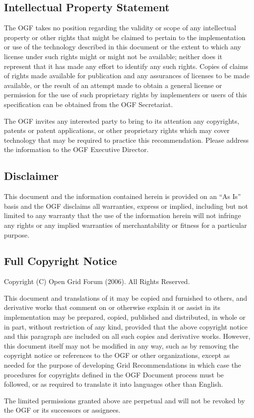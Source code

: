  
 
 
 \subsection{Intellectual Property Statement}
 
  The OGF takes no position regarding the validity or scope of any
  intellectual property or other rights that might be claimed to
  pertain to the implementation or use of the technology described in
  this document or the extent to which any license under such rights
  might or might not be available; neither does it represent that it
  has made any effort to identify any such rights. Copies of claims of
  rights made available for publication and any assurances of licenses
  to be made available, or the result of an attempt made to obtain a
  general license or permission for the use of such proprietary rights
  by implementers or users of this specification can be obtained from
  the OGF Secretariat. 

  The OGF invites any interested party to bring to its attention any
  copyrights, patents or patent applications, or other proprietary
  rights which may cover technology that may be required to practice
  this recommendation. Please address the information to the OGF
  Executive Director.
 
 
 \subsection{Disclaimer}
 
  This document and the information contained herein is provided on an
  ``As Is'' basis and the OGF disclaims all warranties, express or
  implied, including but not limited to any warranty that the use of
  the information herein will not infringe any rights or any implied
  warranties of merchantability or fitness for a particular purpose. 
  
 
 \subsection{Full Copyright Notice}
 
  Copyright (C) Open Grid Forum (2006). All Rights Reserved. 
 
  This document and translations of it may be copied and furnished to
  others, and derivative works that comment on or otherwise explain it
  or assist in its implementation may be prepared, copied, published
  and distributed, in whole or in part, without restriction of any
  kind, provided that the above copyright notice and this paragraph
  are included on all such copies and derivative works.  However, this
  document itself may not be modified in any way, such as by removing
  the copyright notice or references to the OGF or other
  organizations, except as needed for the purpose of developing Grid
  Recommendations in which case the procedures for copyrights defined
  in the OGF Document process must be followed, or as required to
  translate it into languages other than English. 

  The limited permissions granted above are perpetual and will not be
  revoked by the OGF or its successors or assignees. 
 
